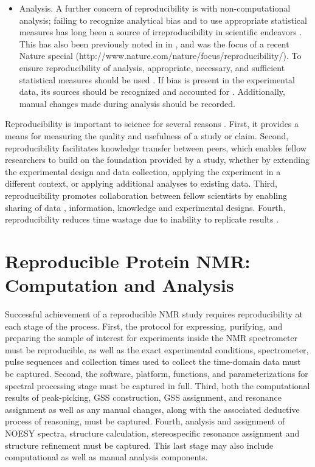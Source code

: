 \begin{itemize}
  \item Analysis.  A further concern of reproducibility is with 
  non-computational analysis; failing to recognize analytical bias and to 
  use appropriate statistical measures has long been a source of 
  irreproducibility in scientific endeavors \cite{sackett1979bias}.
  This has also been previously noted in \cite{ioannidis2005most} 
  in \cite{nuzzo2014statistical, begley2013reproducibility}, 
  and was the focus of a recent Nature special 
  (http://www.nature.com/nature/focus/reproducibility/).
  To ensure reproducibility of analysis, appropriate, necessary, and sufficient
  statistical measures should be used
  \cite{pashler2012replicability, vaux2012numbers}.
  If bias is present in the experimental data, its sources should be recognized
  and accounted for \cite{macarthur2012reproducibility, wagenmakers2012agenda}.
  Additionally, manual changes made during analysis should be recorded.

\end{itemize}

Reproducibility is important to science for several reasons 
\cite{borgman2012conundrum}.  First, it 
provides a means for measuring the quality and usefulness of a study or 
claim.  Second, reproducibility facilitates knowledge transfer between 
peers, which enables fellow researchers to build on the foundation provided 
by a study, whether by extending the experimental design and data collection, 
applying the experiment in a different context, or applying additional analyses 
to existing data.  Third, reproducibility promotes collaboration between fellow 
scientists by enabling sharing of data \cite{rung2013reuse}, 
information, knowledge and experimental 
designs.  Fourth, reproducibility reduces time wastage due to inability to 
replicate results 
\cite{ioannidis2005most, mullard2011reliability, prinz2011reproducibility,
begley2012drug}. 


\section{Reproducible Protein NMR:  Computation and Analysis}
Successful achievement of a reproducible NMR study requires reproducibility at 
each stage of the process.  First, the protocol for expressing, purifying, and 
preparing the sample of interest for experiments inside the NMR spectrometer 
must be reproducible, as well as the exact experimental conditions, 
spectrometer, pulse sequences and collection times used to collect the 
time-domain data must be captured.  Second, the software, platform, functions, 
and parameterizations for spectral processing stage must be captured in full.  
Third, both the computational results of peak-picking, GSS construction,
GSS assignment, and resonance assignment as well as any manual changes, 
along with the associated deductive process of reasoning, must be captured.  
Fourth, analysis and assignment of NOESY spectra, structure calculation, 
stereospecific resonance assignment and structure refinement must be captured.  
This last stage may also include computational as well as manual analysis 
components.  

